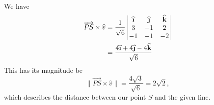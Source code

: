 \begin{example}
\begin{equation}
\begin{aligned}
\end{aligned}
\end{equation}
We have
\begin{equation}
\begin{aligned}
\overrightarrow{PS}\times\widehat{v}
&= \frac{1}{\sqrt{6}}\begin{vmatrix}
\widehat{\textbf{\i}} & \widehat{\textbf{\j}} & \widehat{\textbf{k}}\\
3 & -1 & 2\\
-1 & -1 & -2
\end{vmatrix}\\
&= \frac{4\widehat{\textbf{\i}}+4\widehat{\textbf{\j}}-4\widehat{\textbf{k}}}{\sqrt{6}}
\end{aligned}
\end{equation}
This has its magnitude be
\begin{equation}
\|\overrightarrow{PS}\times\widehat{v}\|
= \frac{4\sqrt{3}}{\sqrt{6}}=2\sqrt{2},
\end{equation}
which describes the distance between our point $S$ and the given line.
\end{example}

